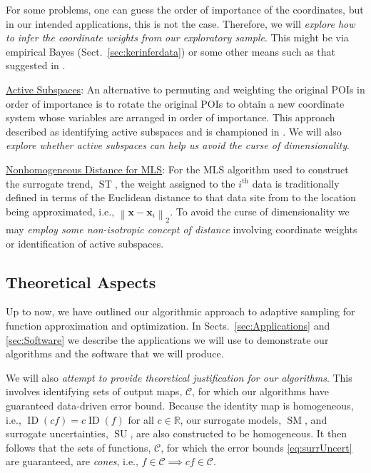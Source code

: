 \documentclass[11pt]{NSFamsart}
\newcommand{\Upara}[1]{\noindent\underline{\upshape #1}:}
\DeclareMathOperator{\SURR}{SM} %
\DeclareMathOperator{\STREND}{ST} %
\DeclareMathOperator{\ID}{ID}
\DeclareMathOperator{\SURRERR}{SU}
\newcommand{\reals}{{\mathbb{R}}}
\newcommand{\bx}{{\boldsymbol{x}}}
\newcommand{\calc}{{\mathcal{C}}}
\newcommand{\norm}[2][{}]{\ensuremath{\left \lVert #2 \right \rVert}_{#1}}
\begin{document}
For some problems, one can guess the order of importance of the coordinates, but in our intended applications, this is not the case.  Therefore, we will \emph{explore how to infer the coordinate weights from our exploratory sample}.  This might be via empirical Bayes (Sect.\ \ref{sec:kerinferdata}) or some other means such as that suggested in \cite{DinHic20a}.

\Upara{Active Subspaces}
An alternative to permuting and weighting  the original POIs in order of importance is to rotate the original POIs to obtain a new coordinate system whose variables are arranged in order of importance.  This approach described as identifying active subspaces and is championed in \cite{constantine2015active}.  We will also \emph{explore whether active subspaces can help us avoid the curse of dimensionality}.

\Upara{Nonhomogeneous Distance for MLS}
For the MLS algorithm used to construct the surrogate trend, $\STREND$, the weight assigned to the $i^{\text{th}}$ data is traditionally defined in terms of the Euclidean distance to that data site from to the location being approximated, i.e., $\norm[2]{\bx - \bx_i}$.  To avoid the curse of dimensionality we may \emph{employ some non-isotropic concept of distance} involving coordinate weights or identification of active subspaces.


\subsection{Theoretical Aspects}

Up to now, we have outlined our algorithmic
approach to adaptive sampling for function approximation and optimization.  In Sects.\ \ref{sec:Applications} and \ref{sec:Software} we describe the applications we will use to demonstrate our algorithms and the software that we will produce.

We will also \emph{attempt to provide theoretical justification for our algorithms}.  This involves identifying sets of output maps, $\calc$, for which our algorithms have guaranteed data-driven error bound.  Because the identity map is homogeneous, i.e., $\ID(cf) = c\ID(f)$ for all $c \in \reals$, our surrogate models, $\SURR$, and surrogate uncertainties, $\SURRERR$, are also constructed to be homogeneous.  It then follows that the sets of functions, $\calc$, for which the error bounds \eqref{eq:surrUncert} are guaranteed, are \emph{cones}, i.e., $f \in \calc \implies cf \in \calc$.
\end{document}
